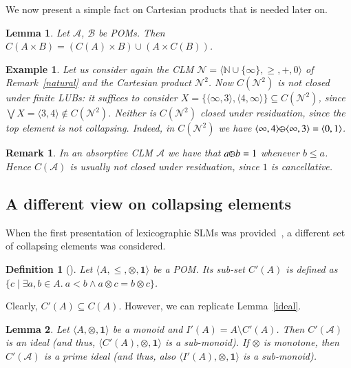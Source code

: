 \documentclass[a4paper]{elsarticle}
\newtheorem{definition}{Definition}
\newtheorem{example}{Example}
\newtheorem{remark}{Remark}
\newtheorem{lemma}{Lemma}
\newcommand{\monop}{\otimes}
\newcommand{\1}{\mathbf{1}}
\def\odiv{{ \ominus\hspace{-8pt}:}\;}
\begin{document}
We now present a simple fact on Cartesian products  that is needed later on.

\begin{lemma}
	Let $\mathcal{A}$, $\mathcal{B}$ be POMs.
	Then $C(A \times B) = (C(A) \times B) \cup (A \times C(B))$. 
\end{lemma}

\begin{example}
	Let us consider again the CLM $\mathcal{N} = \langle \mathbb N \cup \{\infty\}, \geq, +, 0 \rangle$ 
	of Remark~\ref{natural} and the Cartesian product $\mathcal{N}^2$. 
	Now $C(\mathcal{N}^2)$ is not closed under finite LUBs: it suffices to consider 
	$X= \{\langle \infty, 3 \rangle, \langle 4, \infty \rangle\} \subseteq C(\mathcal{N}^2)$,
	since $\bigvee X  = \langle 3,4 \rangle \not \in C(\mathcal{N}^2)$.
	Neither is $C(\mathcal{N}^2)$ closed under residuation, 
	since the top element is not collapsing.
	Indeed, in $C(\mathcal{N}^2)$ we have 
	$\langle \infty, 4 \rangle  \odiv \langle \infty, 3 \rangle = \langle 0,1\rangle$.
\end{example}

\begin{remark}
	In an absorptive CLM $\mathcal{A}$ we have that $a \odiv b = 1$ 
	whenever $b \leq a$. Hence $C(\mathcal{A})$ is usually not closed under residuation, since 
	$1$ is cancellative.
\end{remark}

\subsection{A different view on collapsing elements}

When the first presentation of lexicographic 
SLMs was provided~\cite{GadducciHMW13}, a different 
set of collapsing elements was considered.

\begin{definition}[\cite{GadducciHMW13}]
	Let $\langle A, \leq, \monop, \1 \rangle$ be a POM. Its sub-set $C'(A)$ 
	is defined as 
	$\{ c \mid \exists a, b \in A.\ a < b \wedge a \otimes c = b \otimes c\}$.
\end{definition}

Clearly, $C'(A) \subseteq C(A)$. However, we can replicate Lemma~\ref{ideal}.
%

\begin{lemma}
	Let $\langle A, \monop, \1 \rangle$ be a monoid
	and $I'(A) = A \setminus C'(A)$.
	Then $C'(\mathcal{A})$ is an ideal 
	(and thus, $\langle C'(A), \monop, \1 \rangle$ is a sub-monoid).
	If $\monop$ is monotone, then 
	$C'(\mathcal{A})$ is a prime ideal
	(and thus, also $\langle I'(A), \monop, \1 \rangle$ is a sub-monoid).
\end{lemma}
\end{document}
